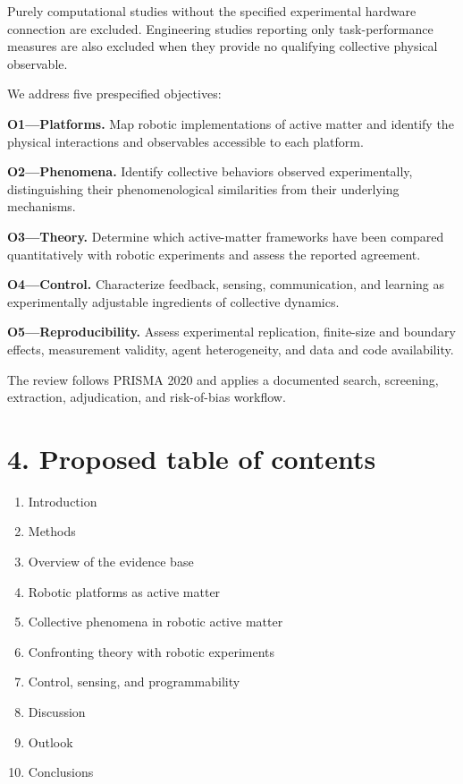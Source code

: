 Purely computational studies without the
specified experimental hardware connection
are excluded. Engineering studies reporting
only task-performance measures are also
excluded when they provide no qualifying
collective physical observable.

We address five prespecified objectives:

\noindent\textbf{O1---Platforms.}
Map robotic implementations of active matter
and identify the physical interactions and
observables accessible to each platform.

\noindent\textbf{O2---Phenomena.}
Identify collective behaviors observed
experimentally, distinguishing their
phenomenological similarities from
their underlying mechanisms.

\noindent\textbf{O3---Theory.}
Determine which active-matter frameworks
have been compared quantitatively with
robotic experiments and assess
the reported agreement.

\noindent\textbf{O4---Control.}
Characterize feedback, sensing,
communication, and learning as
experimentally adjustable ingredients
of collective dynamics.

\noindent\textbf{O5---Reproducibility.}
Assess experimental replication,
finite-size and boundary effects,
measurement validity,
agent heterogeneity,
and data and code availability.

The review follows PRISMA 2020
\cite{Page2021prisma} and applies
a documented search, screening,
extraction, adjudication, and
risk-of-bias workflow.

\section*{4. Proposed table of contents}

\begin{enumerate}
\item Introduction
\item Methods
\item Overview of the evidence base
\item Robotic platforms as active matter
\item Collective phenomena in robotic active matter
\item Confronting theory with robotic experiments
\item Control, sensing, and programmability
\item Discussion
\item Outlook
\item Conclusions
\end{enumerate}

